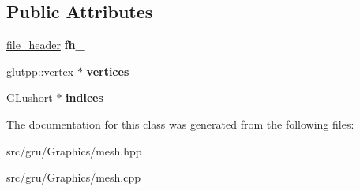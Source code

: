 \subsection*{\-Public \-Attributes}
\begin{DoxyCompactItemize}
\item 
\hypertarget{classglutpp_1_1mesh_a53e047bbd2ec923b2e5d4690bc182687}{\hyperlink{structglutpp_1_1file__header}{file\-\_\-header} {\bfseries fh\-\_\-}}\label{classglutpp_1_1mesh_a53e047bbd2ec923b2e5d4690bc182687}

\item 
\hypertarget{classglutpp_1_1mesh_ae983b2dd19dc6d0d13b86e8605e4d3db}{\hyperlink{structglutpp_1_1vertex}{glutpp\-::vertex} $\ast$ {\bfseries vertices\-\_\-}}\label{classglutpp_1_1mesh_ae983b2dd19dc6d0d13b86e8605e4d3db}

\item 
\hypertarget{classglutpp_1_1mesh_ad928372133364a0a0ed57d47ccee7ca1}{\-G\-Lushort $\ast$ {\bfseries indices\-\_\-}}\label{classglutpp_1_1mesh_ad928372133364a0a0ed57d47ccee7ca1}

\end{DoxyCompactItemize}


\-The documentation for this class was generated from the following files\-:\begin{DoxyCompactItemize}
\item 
src/gru/\-Graphics/mesh.\-hpp\item 
src/gru/\-Graphics/mesh.\-cpp\end{DoxyCompactItemize}
